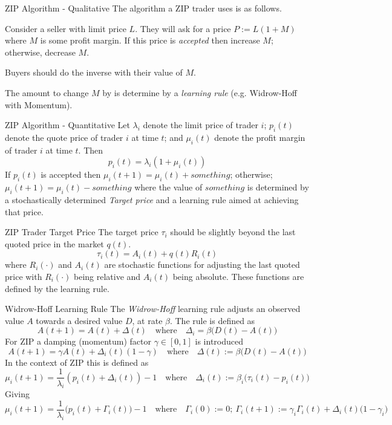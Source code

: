 \documentclass[11pt,a4paper]{article}
\begin{document}
  \begin{proposition}{ZIP Algorithm - Qualitative}
    The algorithm a ZIP trader uses is as follows.
    \par Consider a seller with limit price $L$. They will ask for a price $P:=L(1+M)$ where $M$ is some profit margin. If this price is \textit{accepted} then increase $M$; otherwise, decrease $M$.
    \par Buyers should do the inverse with their value of $M$.
    \par The amount to change $M$ by is determine by a \textit{learning rule} (e.g. Widrow-Hoff with Momentum).
  \end{proposition}

  \begin{proposition}{ZIP Algorithm - Quantitative}
    Let $\lambda_i$ denote the limit price of trader $i$; $p_i(t)$ denote the quote price of trader $i$ at time $t$; and $\mu_i(t)$ denote the profit margin of trader $i$ at time $t$. Then
    \[ p_i(t)=\lambda_i(1+\mu_i(t)) \]
    If $p_i(t)$ is accepted then $\mu_i(t+1)=\mu_i(t)+something$; otherwise; $\mu_i(t+1)=\mu_i(t)-something$ where the value of $something$ is determined by a stochastically determined \textit{Target price} and a learning rule aimed at achieving that price.
  \end{proposition}

  \begin{proposition}{ZIP Trader Target Price}
    The target price $\tau_i$ should be slightly beyond the last quoted price in the market $q(t)$.
    \[ \tau_i(t)=A_i(t)+q(t)R_i(t) \]
    where $R_i(\cdot)$ and $A_i(t)$ are stochastic functions for adjusting the last quoted price with $R_i(\cdot)$ being relative and $A_i(t)$ being absolute. These functions are defined by the learning rule.
  \end{proposition}

  \begin{definition}{Widrow-Hoff Learning Rule}
    The \textit{Widrow-Hoff} learning rule adjusts an observed value $A$ towards a desired value $D$, at rate $\beta$. The rule is defined as
    \[ A(t+1)=A(t)+\Delta(t)\quad\text{where}\quad\Delta_i=\beta\big(D(t)-A(t)\big) \]
    For ZIP a damping (momentum) factor $\gamma\in[0,1]$ is introduced
    \[ A(t+1)=\gamma A(t)+\Delta_i(t)(1-\gamma)\quad\text{where}\quad\Delta(t):=\beta\big(D(t)-A(t)\big) \]
    In the context of ZIP this is defined as
    \[ \mu_i(t+1)=\frac1{\lambda_i}(p_i(t)+\Delta_i(t))-1\quad\text{where}\quad\Delta_i(t):=\beta_i\big(\tau_i(t)-p_i(t)\big) \]
    Giving
    \[ \mu_i(t+1)=\frac1{\lambda_i}\big(p_i(t)+\Gamma_i(t)\big)-1\quad\text{where}\quad\Gamma_i(0):=0;\ \Gamma_i(t+1):=\gamma_i\Gamma_i(t)+\Delta_i(t)\big(1-\gamma_i\big) \]
  \end{definition}
\end{document}
